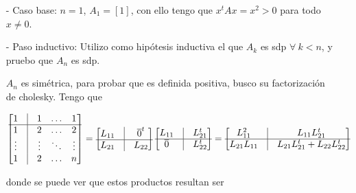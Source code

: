 \begin{itemize}
    \item[-] Caso base: $n=1$, $A_1 = [1]$, con ello tengo que $x^{t}Ax = x^2 > 0$ para todo $x \neq 0$.
    \item[-] Paso inductivo: Utilizo como hipótesis inductiva el que $A_k$ es sdp $\forall~k < n$, y pruebo que $A_n$ es sdp.

    $A_n$ es simétrica, para probar que es definida positiva, busco su factorización de cholesky. Tengo que 

    \[
    \begin{bmatrix}
        1 & \vline & 1 & \ldots & 1 \\
        \hline
        1 & \vline & 2 & \ldots & 2 \\
        \vdots & \vline & \vdots & \ddots & \vdots \\
        1 & \vline & 2 & \ldots & n \\
    \end{bmatrix}
    =
    \begin{bmatrix}
        L_{11} & \vline & \overline 0^t \\
        \hline
        L_{21} & \vline & L_{22}
    \end{bmatrix}
    \begin{bmatrix}
        L_{11} & \vline & L_{21}^{t} \\
        \hline
        \overline 0 & \vline & L_{22}^{t}
    \end{bmatrix}
    =
    \begin{bmatrix}
        L_{11}^{2} & \vline & L_{11}L_{21}^{t} \\
        \hline
        L_{21}L_{11} & \vline & L_{21}L_{21}^{t} + L_{22}L_{22}^{t}
    \end{bmatrix}
    \]

    donde se puede ver que estos productos resultan ser


\end{itemize}
